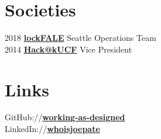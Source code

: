 \documentclass[letterpaper]{deedy-resume} %
\begin{document}
\begin{minipage}[t]{0.33\textwidth}
\sectionspace %


\section{Societies}
2018 \textbf{\href{https://github.com/lockfale}{lockFALE}} Seattle Operations Team \\
2014 \textbf{\href{https://www.hackucf.org/}{Hack@kUCF}} Vice President \\
\sectionspace %


\section{Links}

GitHub://\href{https://github.com/working-as-designed}{\bf working-as-designed} \\
LinkedIn://\href{https://linkedin.com/in/whoisjoepate/}{\bf whoisjoepate} \\

\sectionspace %


\end{minipage} %
\hfill
%
%
\end{document}
